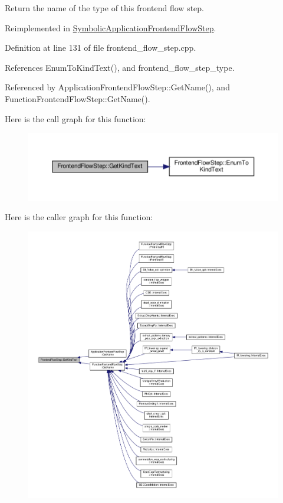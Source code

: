 Return the name of the type of this frontend flow step. 



Reimplemented in \hyperlink{classSymbolicApplicationFrontendFlowStep_a3fdc0f543227c3393142eba328137704}{Symbolic\+Application\+Frontend\+Flow\+Step}.



Definition at line 131 of file frontend\+\_\+flow\+\_\+step.\+cpp.



References Enum\+To\+Kind\+Text(), and frontend\+\_\+flow\+\_\+step\+\_\+type.



Referenced by Application\+Frontend\+Flow\+Step\+::\+Get\+Name(), and Function\+Frontend\+Flow\+Step\+::\+Get\+Name().

Here is the call graph for this function\+:
\nopagebreak
\begin{figure}[H]
\begin{center}
\leavevmode
\includegraphics[width=350pt]{d9/d37/classFrontendFlowStep_a264285918b0d8ea193eb1c2f3af17ef4_cgraph}
\end{center}
\end{figure}
Here is the caller graph for this function\+:
\nopagebreak
\begin{figure}[H]
\begin{center}
\leavevmode
\includegraphics[width=350pt]{d9/d37/classFrontendFlowStep_a264285918b0d8ea193eb1c2f3af17ef4_icgraph}
\end{center}
\end{figure}
